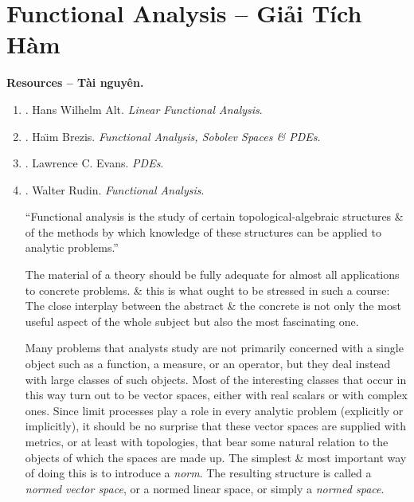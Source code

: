 \documentclass{article}
\begin{document}
\section{Functional Analysis -- Giải Tích Hàm}
\textbf{\textsf{Resources -- Tài nguyên.}}
\begin{enumerate}
	\item \cite{Alt2016}. {\sc Hans Wilhelm Alt}. {\it Linear Functional Analysis}.
	\item \cite{Brezis2011}. {\sc Ha\"\i m Brezis}. {\it Functional Analysis, Sobolev Spaces \& PDEs}.
	\item \cite{Evans2010}. {\sc Lawrence C. Evans}. {\it PDEs}.
	\item \cite{Rudin1991}. {\sc Walter Rudin}. {\it Functional Analysis}.
	
	``Functional analysis is the study of certain topological-algebraic structures \& of the methods by which knowledge of these structures can be applied to analytic problems.''
	
	The material of a theory should be fully adequate for almost all applications to concrete problems. \& this is what ought to be stressed in such a course: The close interplay between the abstract \& the concrete is not only the most useful aspect of the whole subject but also the most fascinating one.
	
	Many problems that analysts study are not primarily concerned with a single object such as a function, a measure, or an operator, but they deal instead with large classes of such objects. Most of the interesting classes that occur in this way turn out to be vector spaces, either with real scalars or with complex ones. Since limit processes play a role in every analytic problem (explicitly or implicitly), it should be no surprise that these vector spaces are supplied with metrics, or at least with topologies, that bear some natural relation to the objects of which the spaces are made up. The simplest \& most important way of doing this is to introduce a {\it norm}. The resulting structure is called a {\it normed vector space}, or a normed linear space, or simply a {\it normed space}.
	

\end{enumerate}
\end{document}
